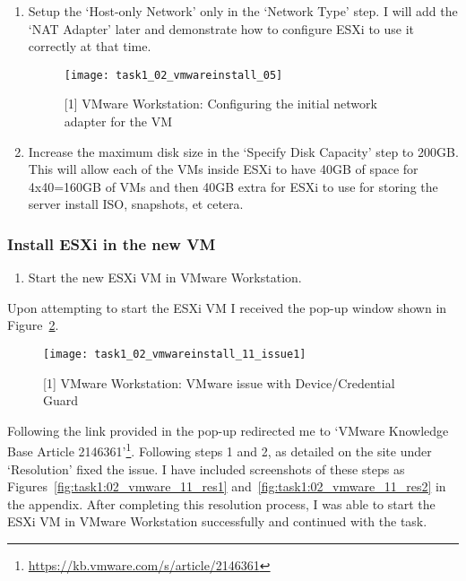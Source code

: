 \begin{enumerate}[resume*=task1methodology]
\begin{enumerate}[label=(\alph*)]
      \item Setup the `Host-only Network' only in the `Network Type' step. I will add the `NAT Adapter' later and demonstrate how to configure ESXi to use it correctly at that time.
        \begin{figure}[H]
          \centering
          \captionsetup{skip=2pt}
          \texttt{[image: task1\_02\_vmwareinstall\_05]}
          \caption{[1] VMware Workstation: Configuring the initial network adapter for the VM}
          \label{fig:task1:02_vmwarewiz_05}
        \end{figure}
      \item Increase the maximum disk size in the `Specify Disk Capacity' step to 200GB. This will allow each of the VMs inside ESXi to have 40GB of space for 4x40=160GB of VMs and then 40GB extra for ESXi to use for storing the server install ISO, snapshots, et cetera.
    \end{enumerate}
\end{enumerate}

\subsubsection{Install ESXi in the new VM}
\begin{enumerate}[resume*=task1methodology]
  \item Start the new ESXi VM in VMware Workstation.
\end{enumerate}

\noindent Upon attempting to start the ESXi VM I received the pop-up window shown in Figure~\ref{fig:task1:02_vmwarewiz_11_issue}.

\begin{figure}[H]
  \centering
  \captionsetup{skip=2pt}
  \texttt{[image: task1\_02\_vmwareinstall\_11\_issue1]}
  \caption{[1] VMware Workstation: VMware issue with Device/Credential Guard}
  \label{fig:task1:02_vmwarewiz_11_issue}
\end{figure}

\noindent Following the link provided in the pop-up redirected me to `VMware Knowledge Base Article 2146361'\footnote{\url{https://kb.vmware.com/s/article/2146361}}. Following steps 1 and 2, as detailed on the site under `Resolution' fixed the issue. I have included screenshots of these steps as Figures~\ref{fig:task1:02_vmware_11_res1} and~\ref{fig:task1:02_vmware_11_res2} in the  appendix. After completing this resolution process, I was able to start the ESXi VM in VMware Workstation successfully and continued with the task.

